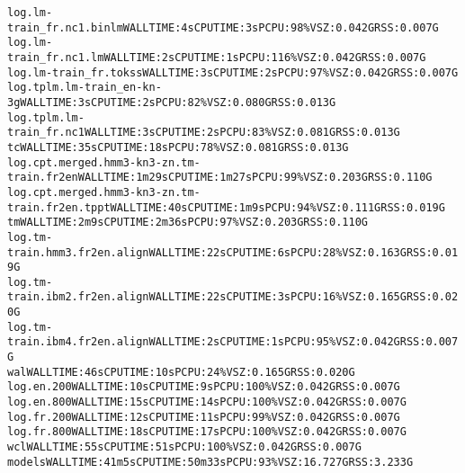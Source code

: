 \documentclass[11pt,letterpaper]{article}
\begin{document}
\begin{tiny}
\begin{alltt}
         log.lm-train_fr.nc1.binlm                        WALL TIME: 4s       CPU TIME: 3s        PCPU: 98\%    VSZ: 0.042G    RSS: 0.007G
         log.lm-train_fr.nc1.lm                           WALL TIME: 2s       CPU TIME: 1s        PCPU: 116\%   VSZ: 0.042G    RSS: 0.007G
         log.lm-train_fr.tokss                            WALL TIME: 3s       CPU TIME: 2s        PCPU: 97\%    VSZ: 0.042G    RSS: 0.007G
         log.tplm.lm-train_en-kn-3g                       WALL TIME: 3s       CPU TIME: 2s        PCPU: 82\%    VSZ: 0.080G    RSS: 0.013G
         log.tplm.lm-train_fr.nc1                         WALL TIME: 3s       CPU TIME: 2s        PCPU: 83\%    VSZ: 0.081G    RSS: 0.013G
      tc                                                  WALL TIME: 35s      CPU TIME: 18s       PCPU: 78\%    VSZ: 0.081G    RSS: 0.013G
         log.cpt.merged.hmm3-kn3-zn.tm-train.fr2en        WALL TIME: 1m29s    CPU TIME: 1m27s     PCPU: 99\%    VSZ: 0.203G    RSS: 0.110G
         log.cpt.merged.hmm3-kn3-zn.tm-train.fr2en.tppt   WALL TIME: 40s      CPU TIME: 1m9s      PCPU: 94\%    VSZ: 0.111G    RSS: 0.019G
      tm                                                  WALL TIME: 2m9s     CPU TIME: 2m36s     PCPU: 97\%    VSZ: 0.203G    RSS: 0.110G
         log.tm-train.hmm3.fr2en.align                    WALL TIME: 22s      CPU TIME: 6s        PCPU: 28\%    VSZ: 0.163G    RSS: 0.019G
         log.tm-train.ibm2.fr2en.align                    WALL TIME: 22s      CPU TIME: 3s        PCPU: 16\%    VSZ: 0.165G    RSS: 0.020G
         log.tm-train.ibm4.fr2en.align                    WALL TIME: 2s       CPU TIME: 1s        PCPU: 95\%    VSZ: 0.042G    RSS: 0.007G
      wal                                                 WALL TIME: 46s      CPU TIME: 10s       PCPU: 24\%    VSZ: 0.165G    RSS: 0.020G
         log.en.200                                       WALL TIME: 10s      CPU TIME: 9s        PCPU: 100\%   VSZ: 0.042G    RSS: 0.007G
         log.en.800                                       WALL TIME: 15s      CPU TIME: 14s       PCPU: 100\%   VSZ: 0.042G    RSS: 0.007G
         log.fr.200                                       WALL TIME: 12s      CPU TIME: 11s       PCPU: 99\%    VSZ: 0.042G    RSS: 0.007G
         log.fr.800                                       WALL TIME: 18s      CPU TIME: 17s       PCPU: 100\%   VSZ: 0.042G    RSS: 0.007G
      wcl                                                 WALL TIME: 55s      CPU TIME: 51s       PCPU: 100\%   VSZ: 0.042G    RSS: 0.007G
   models                                                 WALL TIME: 41m5s    CPU TIME: 50m33s    PCPU: 93\%    VSZ: 16.727G   RSS: 3.233G

\end{alltt}
\end{tiny}
\end{document}
